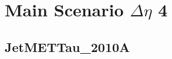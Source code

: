 \documentclass[11pt]{book}
\begin{document}
\newpage
\chapter{Main Scenario $\Delta\eta$ 4 }
\section{JetMETTau\_2010A}

\begin{comment}

\subsection{Pythia 6 Z2* Response Matrix}

\begin{figure}[ht]
\centering
\texttt{[image: ../output/check\_response/png/pythia6\_z2\_jetmettau\_delta\_phi\_deta4\_response.png]}
\caption{$\Delta\phi$ main scenario deta4 JetMETTau\_2010A - Pythia 6 Z2* response matrix}
\label{p6_jetmettau_delta_phi_deta4_response}
\end{figure}

\begin{figure}[ht]
\centering
\texttt{[image: ../output/check\_response/png/pythia6\_z2\_jetmettau\_delta\_phi\_deta4\_response\_norm.png]}
\caption{$\Delta\phi$ main scenario deta4 JetMETTau\_2010A - Pythia 6 Z2* response matrix normalized}
\label{p6_jetmettau_delta_phi_deta4_response_norm}
\end{figure}

\begin{figure}[ht]
\centering
\texttt{[image: ../output/check\_response/png/pythia6\_z2\_jetmettau\_delta\_phi\_deta4\_response\_all.png]}
\caption{$\Delta\phi$ main scenario deta4 JetMETTau\_2010A - Pythia 6 Z2* response matrix with fakes and miss}
\label{p6_jetmettau_delta_phi_deta4_response_all}
\end{figure}

\begin{figure}[ht]
\centering
\texttt{[image: ../output/check\_response/png/pythia6\_z2\_jetmettau\_delta\_phi\_deta4\_response\_all\_norm.png]}
\caption{$\Delta\phi$ main scenario deta4 JetMETTau\_2010A - Pythia 6 Z2* response matrix with fakes and miss normalized}
\label{p6_jetmettau_delta_phi_deta4_response_all_norm}
\end{figure}

\begin{figure}[ht]
\centering
\texttt{[image: ../output/check\_response/png/pythia6\_z2\_jetmettau\_delta\_phi\_deta4\_fakes.png]}
\texttt{[image: ../output/check\_response/png/pythia6\_z2\_jetmettau\_delta\_phi\_deta4\_miss.png]}
\caption{$\Delta\phi$ main scenario deta4 JetMETTau\_2010A - Pythia 6 Z2* fakes and miss distributions}
\label{p6_jetmettau_delta_phi_deta4_fakesmiss}
\end{figure}



\end{comment}
\end{document}
